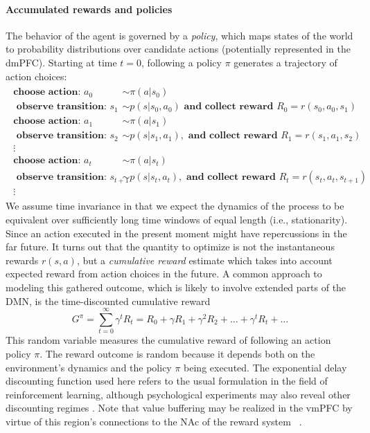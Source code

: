 \documentclass[10pt,letterpaper]{article}
\begin{document}
\paragraph*{Accumulated rewards and policies}
The behavior of the agent is governed by a \textit{policy}, which maps states of the world
to probability distributions over candidate actions
(potentially represented in the dmPFC).
Starting at time $t=0$,
following a policy $\pi$ generates a trajectory of action choices:
\begin{eqnarray*}
  \begin{split}
    \textbf{choose action: }a_0 &\sim \pi(a|s_0)\\
    \textbf{ observe transition: }s_1 &\sim p(s|s_0,a_0)\textbf{ and collect
      reward }R_0 = r(s_0, a_0, s_1)\\
    \textbf{choose action: }a_1 &\sim \pi(a|s_1)\\
    \textbf{ observe transition: }s_2 &\sim p(s|s_1,a_1), \textbf{ and collect
      reward }R_1 = r(s_1, a_1,s_2)\\
    \vdots\\
    \textbf{choose action: }a_{t} &\sim \pi(a|s_{t})\\
    \textbf{ observe transition: }s_{t+1} &\sim p(s|s_{t},a_{t}), \textbf{ and
      collect reward }R_{t} = r(s_{t}, a_{t},s_{t+1})\\
    \vdots
  \end{split}
\end{eqnarray*}
We assume time invariance
in that we expect the dynamics of the process
to be equivalent over sufficiently long time windows of equal length (i.e., stationarity).
Since an action executed in the present moment might have repercussions in the
far future. It turns out that the quantity to optimize is not the instantaneous
rewards $r(s, a)$, but a \textit{cumulative reward} estimate which takes into
account expected reward from action choices in the future. A common approach to
modeling this gathered outcome,
which is likely to involve extended parts of the DMN,
is the time-discounted cumulative reward%
\begin{equation}
  \label{eq:cumr}
  G^\pi = \sum_{t=0}^{\infty}\gamma^{t}R_t =
  R_0 + \gamma R_1 + \gamma^2 R_2 + \ldots + \gamma^tR_t + \ldots
\end{equation}
This random variable
measures the cumulative reward of
following an action policy $\pi$.
The reward outcome is random because it depends both on the environment's dynamics and the
policy $\pi$ being executed. The exponential delay discounting function used
here refers to the usual formulation in the field of reinforcement learning,
although psychological experiments may also reveal other discounting regimes
\citep{green2004discounting}.
%
Note that value buffering may be realized in the vmPFC by virtue of
this region's connections to the NAc of the reward system
~\citep{carlezon2009,haber1995,croxson2005quantitative}.
\end{document}
